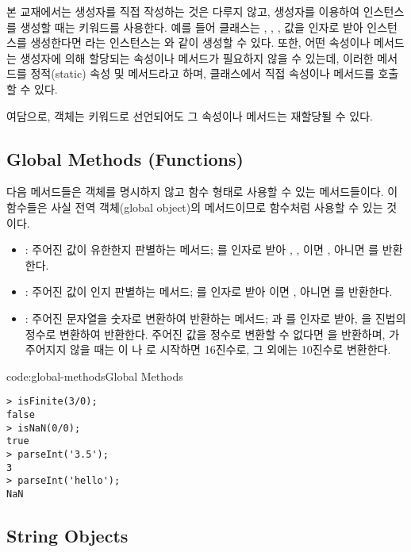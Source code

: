 본 교재에서는 생성자를 직접 작성하는 것은 다루지 않고, 생성자를 이용하여 인스턴스를 생성할 때는  키워드를 사용한다. 예를 들어  클래스는 , , ,  값을 인자로 받아 인스턴스를 생성한다면 라는 인스턴스는 와 같이 생성할 수 있다. 또한, 어떤 속성이나 메서드는 생성자에 의해 할당되는 속성이나 메서드가 필요하지 않을 수 있는데, 이러한 메서드를 정적(static) 속성 및 메서드라고 하며, 클래스에서 직접 속성이나 메서드를 호출할 수 있다.

여담으로, 객체는  키워드로 선언되어도 그 속성이나 메서드는 재할당될 수 있다.

\subsection*{Global Methods (Functions)}

다음 메서드들은 객체를 명시하지 않고 함수 형태로 사용할 수 있는 메서드들이다. 이 함수들은 사실 전역 객체(global object)의 메서드이므로 함수처럼 사용할 수 있는 것이다.

\begin{itemize}
    \item {}: 주어진 값이 유한한지 판별하는 메서드; 를 인자로 받아 , , 이면 , 아니면 를 반환한다.
    \item {}: 주어진 값이 인지 판별하는 메서드; 를 인자로 받아 이면 , 아니면 를 반환한다.
    \item {}: 주어진 문자열을 숫자로 변환하여 반환하는 메서드; 과 를 인자로 받아, 을 진법의 정수로 변환하여 반환한다. 주어진 값을 정수로 변환할 수 없다면 을 반환하며, 가 주어지지 않을 때는 이 나 로 시작하면 16진수로, 그 외에는 10진수로 변환한다.
\end{itemize}

\begin{codeenv}{code:global-methods}{Global Methods}\begin{verbatim}
> isFinite(3/0);
false
> isNaN(0/0);
true
> parseInt('3.5');
3
> parseInt('hello');
NaN
\end{verbatim}
\end{codeenv}

\subsection*{String Objects}

